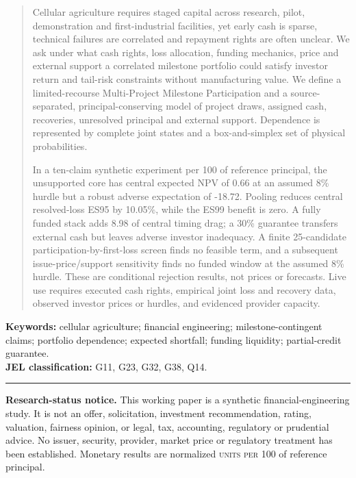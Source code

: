 \documentclass[11pt,a4paper]{article}
\newcommand{\demounit}{\textsc{units per 100}}
\begin{document}
\begin{abstract}
Cellular agriculture requires staged capital across research, pilot, demonstration and first-industrial facilities, yet early cash is sparse, technical failures are correlated and repayment rights are often unclear. We ask under what cash rights, loss allocation, funding mechanics, price and external support a correlated milestone portfolio could satisfy investor return and tail-risk constraints without manufacturing value. We define a limited-recourse Multi-Project Milestone Participation and a source-separated, principal-conserving model of project draws, assigned cash, recoveries, unresolved principal and external support. Dependence is represented by complete joint states and a box-and-simplex set of physical probabilities.

In a ten-claim synthetic experiment per 100 of reference principal, the unsupported core has central expected NPV of 0.66 at an assumed 8\% hurdle but a robust adverse expectation of -18.72. Pooling reduces central resolved-loss ES95 by 10.05\%, while the ES99 benefit is zero. A fully funded stack adds 8.98 of central timing drag; a 30\% guarantee transfers external cash but leaves adverse investor inadequacy. A finite 25-candidate participation-by-first-loss screen finds no feasible term, and a subsequent issue-price/support sensitivity finds no funded window at the assumed 8\% hurdle. These are conditional rejection results, not prices or forecasts. Live use requires executed cash rights, empirical joint loss and recovery data, observed investor prices or hurdles, and evidenced provider capacity.
\end{abstract}

\textbf{Keywords:} cellular agriculture; financial engineering; milestone-contingent claims; portfolio dependence; expected shortfall; funding liquidity; partial-credit guarantee.\\
\textbf{JEL classification:} G11, G23, G32, G38, Q14.

\vspace{3mm}
\begin{minipage}{\textwidth}
  \color{DeepForest}\hrule height 0.7pt\vspace{0.55em}
  \footnotesize\textbf{Research-status notice.} This working paper is a synthetic financial-engineering study. It is not an offer, solicitation, investment recommendation, rating, valuation, fairness opinion, or legal, tax, accounting, regulatory or prudential advice. No issuer, security, provider, market price or regulatory treatment has been established. Monetary results are normalized \demounit{} of reference principal.
\end{minipage}
\clearpage
\end{document}
